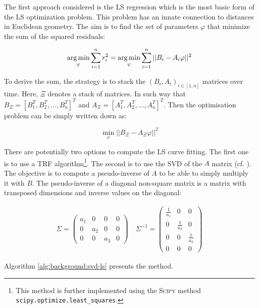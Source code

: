 \documentclass[/home/francois/latex/report/main.tex]{subfiles}
\begin{document}
The first approach considered is the \ac{LS} regression which is the most basic form of the \ac{LS} optimization problem. This problem has an innate connection to distances in Euclidean geometry. The aim is to find the set of parameters $\varphi$ that minimize the sum of the squared residuals:

\begin{equation}
  \operatorname*{arg\,min}_{\varphi} \sum_{i=1}^{n} r_i^2 = \operatorname*{arg\,min}_{\varphi} \sum_{i=1}^{n} ||B_i - A_i \varphi||^2
\end{equation}

To derive the sum, the strategy is to stack the $(B_i, A_i)_{i \in [1, n]}$ matrices over time. Here, $\Xi$ denotes a stack of matrices. In such way that $B_\Xi = [B_1^T, B_2^T, \ldots, B_n^T]^T$ and $A_\Xi = [A_1^T, A_2^T, \ldots, A_n^T]^T$. Then the optimisation problem can be simply written down as:

\begin{equation}
  \label{eq:background:stacked-ls}
  \min_{\varphi} ||B_\Xi - A_\Xi \varphi||^2
\end{equation}

There are potentially two options to compute the \ac{LS} curve fitting. The first one is to use a \ac{TRF} algorithm\footnote{This method is further implemented using the \textsc{Scipy} method \texttt{scipy.optimize.least\_squares}.}. The second is to use the \ac{SVD} of the $A$ matrix (cf. \cite{Gander2008}). The objective is to compute a pseudo-inverse of $A$ to be able to simply multiply it with $B$. The pseudo-inverse of a diagonal non-square matrix is a matrix with transposed dimensions and inverse values on the diagonal:

\begin{align*}
  \Sigma =
  \begin{pmatrix}
    a_1 & 0 & 0 & 0 \\
    0 & a_2 & 0 & 0 \\
    0 & 0 & a_3 & 0
  \end{pmatrix}
  &
  \ \Sigma^{-1} =
  \begin{pmatrix}
    \frac{1}{a_1} & 0 & 0 \\
    0 & \frac{1}{a_2} & 0 \\
    0 & 0 & \frac{1}{a_3} \\
    0 & 0 & 0
  \end{pmatrix}
\end{align*}


Algorithm \ref{alg:background:svd-ls} presents the method.
\end{document}
